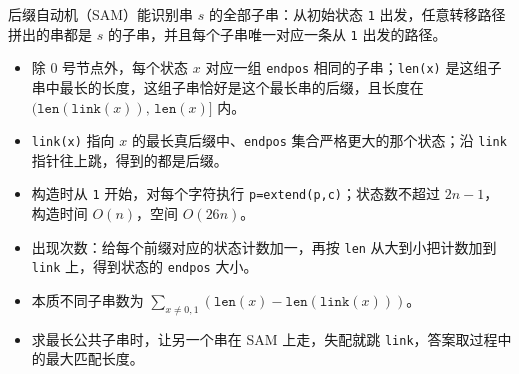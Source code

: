 后缀自动机（SAM）能识别串 $s$ 的全部子串：从初始状态 \texttt{1} 出发，任意转移路径拼出的串都是 $s$ 的子串，并且每个子串唯一对应一条从 \texttt{1} 出发的路径。

\begin{itemize}
  \item 除 0 号节点外，每个状态 $x$ 对应一组 \texttt{endpos} 相同的子串；\texttt{len(x)} 是这组子串中最长的长度，这组子串恰好是这个最长串的后缀，且长度在 $(\texttt{len}(\texttt{link}(x)),\,\texttt{len}(x)]$ 内。
  \item \texttt{link(x)} 指向 $x$ 的最长真后缀中、\texttt{endpos} 集合严格更大的那个状态；沿 \texttt{link} 指针往上跳，得到的都是后缀。
  \item 构造时从 \texttt{1} 开始，对每个字符执行 \texttt{p=extend(p,c)}；状态数不超过 $2n-1$，构造时间 $O(n)$，空间 $O(26n)$。
  \item 出现次数：给每个前缀对应的状态计数加一，再按 \texttt{len} 从大到小把计数加到 \texttt{link} 上，得到状态的 \texttt{endpos} 大小。
  \item 本质不同子串数为 $\sum_{x\ne 0,1}(\texttt{len}(x)-\texttt{len}(\texttt{link}(x)))$。
  \item 求最长公共子串时，让另一个串在 SAM 上走，失配就跳 \texttt{link}，答案取过程中的最大匹配长度。
\end{itemize}
